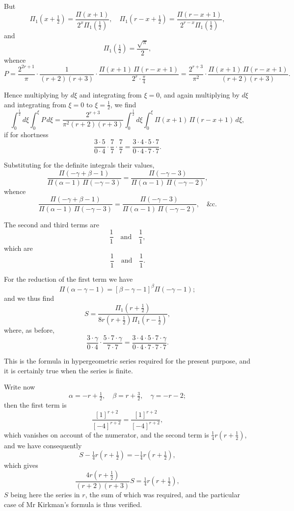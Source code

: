 \documentclass[11pt,a4paper]{article}
\theoremstyle{plain}
\begin{document}
But
\[
\Pi_1(x + \tfrac{1}{2}) = \frac{\Pi(x+1)}{2^x \Pi_1(\tfrac{1}{2})}, \quad \Pi_1(r - x + \tfrac{1}{2}) = \frac{\Pi(r-x+1)}{2^{r-x}\Pi_1(\tfrac{1}{2})},
\]
and
\[
\Pi_1(\tfrac{1}{2}) = \frac{\sqrt{\pi}}{2},
\]
whence
\[
P = \frac{2^{2r+1}}{\pi} \cdot \frac{1}{(r+2)(r+3)} \cdot \frac{\Pi(x+1)\,\Pi(r-x+1)}{2^r \cdot \tfrac{\pi}{4}} = \frac{2^{r+3}}{\pi^2} \cdot \frac{\Pi(x+1)\,\Pi(r-x+1)}{(r+2)(r+3)}.
\]

Hence multiplying by $d\xi$ and integrating from $\xi=0$, and again multiplying by $d\xi$ and integrating from $\xi=0$ to $\xi=\tfrac{1}{2}$, we find
\[
\int_0^{\frac{1}{2}} d\xi \int_0^{\xi} P\,d\xi = \frac{2^{r+3}}{\pi^2(r+2)(r+3)} \int_0^{\frac{1}{2}} d\xi \int_0^{\xi} \Pi(x+1)\,\Pi(r-x+1)\,d\xi,
\]
if for shortness
\[
\frac{3 \cdot 5}{0 \cdot 4} \cdot \frac{7}{7} \cdot \frac{7}{7} = \frac{3 \cdot 4 \cdot 5 \cdot 7}{0 \cdot 4 \cdot 7 \cdot 7}.
\]

Substituting for the definite integrals their values,
\[
\frac{\Pi(-\gamma+\beta-1)}{\Pi(\alpha-1)\,\Pi(-\gamma-3)} = \frac{\Pi(-\gamma-3)}{\Pi(\alpha-1)\,\Pi(-\gamma-2)},
\]
whence
\[
\frac{\Pi(-\gamma+\beta-1)}{\Pi(\alpha-1)\,\Pi(-\gamma-3)} = \frac{\Pi(-\gamma-3)}{\Pi(\alpha-1)\,\Pi(-\gamma-2)}, \quad \text{&c.}
\]

The second and third terms are
\[
\frac{1}{1} \quad \text{and} \quad \frac{1}{1},
\]
which are
\[
\frac{1}{1} \quad \text{and} \quad \frac{1}{1}.
\]

For the reduction of the first term we have
\[
\Pi(\alpha - \gamma - 1) = [\beta - \gamma - 1]^\beta \Pi(-\gamma - 1);
\]
and we thus find
\[
S = \frac{\Pi_1(r + \tfrac{1}{2})}{8r(r + \tfrac{1}{2})\Pi_1(r - \tfrac{1}{2})},
\]
where, as before,
\[
\frac{3 \cdot \gamma}{0 \cdot 4} \cdot \frac{5 \cdot 7 \cdot \gamma}{7 \cdot 7} = \frac{3 \cdot 4 \cdot 5 \cdot 7 \cdot \gamma}{0 \cdot 4 \cdot 7 \cdot 7 \cdot 7}.
\]

This is the formula in hypergeometric series required for the present purpose, and it is certainly true when the series is finite.

Write now
\[
\alpha = -r + \tfrac{1}{2}, \quad \beta = r + \tfrac{3}{2}, \quad \gamma = -r - 2;
\]
then the first term is
\[
\frac{[1]^{r+2}}{[-4]^{r+2}} = \frac{[1]^{r+2}}{[-4]^{r+2}},
\]
which vanishes on account of the numerator, and the second term is $\tfrac{1}{4}r(r+\tfrac{1}{2})$, and we have consequently
\[
S - \tfrac{1}{4}r(r + \tfrac{1}{2}) = -\tfrac{1}{4}r(r + \tfrac{1}{2}),
\]
which gives
\[
\frac{4r(r+\tfrac{1}{2})}{(r+2)(r+3)} S = \tfrac{1}{4}r(r + \tfrac{1}{2}),
\]
$S$ being here the series in $r$, the sum of which was required, and the particular case of Mr Kirkman's formula is thus verified.
\end{document}
